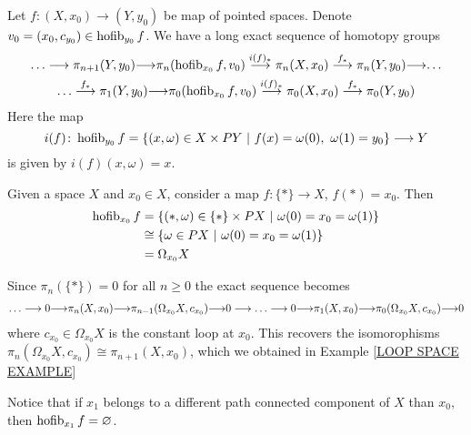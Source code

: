 \begin{corollary}
\label{HOMOTOPY FIBRATION EX SEQ COR}
Let $f\colon (X, x_{0})\to (Y, y_{0})$ be map of pointed spaces.
Denote $v_{0} = (x_{0}, c_{y_{0}})\in \operatorname{hofib}_{y_{0}}f$. 
We have a long exact sequence of homotopy groups
\begin{multline*}
{\dots}\longrightarrow \pi_{n+1}(Y, y_{0})  {\longrightarrow} 
\pi_{n}(\operatorname{hofib}_{x_{0}}f , v_{0}) \overset{i(f)_{\ast}}{\longrightarrow}
\pi_{n}(X, x_{0}) \overset{f_{\ast}}{\longrightarrow}
\pi_{n}(Y, y_{0}) {\longrightarrow} {\dots} \\
{\dots} \overset{f_{\ast}}{\longrightarrow} \pi_{1}(Y, y_{0}) {\longrightarrow} 
\pi_{0}(\operatorname{hofib}_{x_{0}}f , v_{0})\overset{i(f)_{\ast}}{\longrightarrow} 
\pi_{0}(X, x_{0}) \overset{f_{\ast}}{\longrightarrow} 
\pi_{0}(Y, y_{0}) 
\end{multline*}
Here the map 
\[
i(f)\colon 
\hofib_{y_{0}}f = \{(x, \omega) \in X \times PY \ |\ 
f(x)=\omega(0), \ \omega(1) = y_{0}\} \lra Y
\]
is given by $i(f)(x, \omega) = x$.
\end{corollary}

\begin{example}
Given a space $X$ and $x_{0}\in X$, consider a map $f\colon \{\ast\} \to X$, 
$f(\ast) = x_{0}$. Then 
\begin{align*}
\operatorname{hofib}_{x_{0}}f & = \{(\ast, \omega) \in \{\ast\} \times PX \ |\
\omega(0) = x_{0} = \omega(1) \} \\
& \cong \{ \omega \in  PX \ |\ \omega(0) = x_{0} = \omega(1) \} \\
& = \Omega_{x_{0}}X
\end{align*}

Since $\pi_{n}(\{\ast\}) = 0$ for all $n\geq 0$ the exact sequence 
becomes 
\begin{multline*}
{\dots}\longrightarrow 
0 {\longrightarrow}
\pi_{n}(X, x_{0}) {\longrightarrow}
\pi_{n-1}(\Omega_{x_{0}}X, c_{x_{0}}) {\longrightarrow} 
0 \longrightarrow{\dots}\longrightarrow 
0  {\longrightarrow}
\pi_{1}(X, x_{0}) {\longrightarrow}
\pi_{0}(\Omega_{x_{0}}X, c_{x_{0}}){\longrightarrow} 
0
\end{multline*}
where $c_{x_{0}}\in \Omega_{x_{0}}X$ is the constant loop at $x_{0}$.
This recovers the isomorophisms 
$\pi_{n}(\Omega_{x_{0}}X, c_{x_{0}})\cong \pi_{n+1}(X, x_{0})$, which we obtained 
in Example \ref{LOOP SPACE EXAMPLE}


Notice that if $x_{1}$ belongs to a different path connected component 
of $X$ than $x_{0}$, then $\operatorname{hofib}_{x_{1}}f = \varnothing$. 
\end{example}


